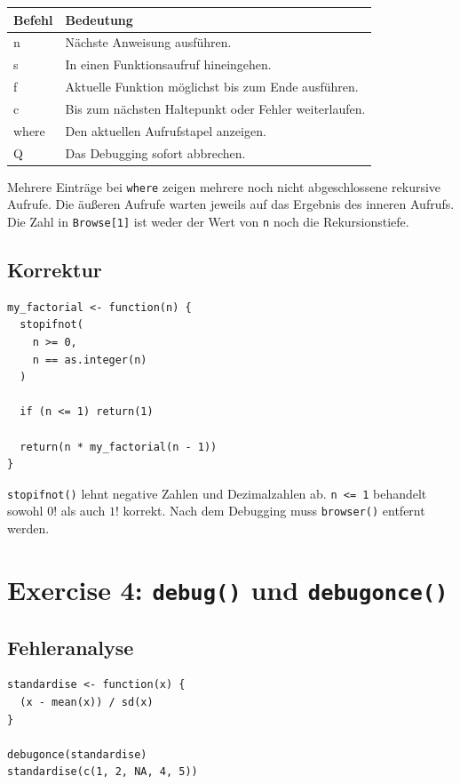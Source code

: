\documentclass[11pt,a4paper]{ctexart}
\begin{document}
\begin{longtable}{>{\ttfamily}p{}p{}}
\toprule
\normalfont Befehl & Bedeutung \\
\midrule
\endhead
n & Nächste Anweisung ausführen.\\
s & In einen Funktionsaufruf hineingehen.\\
f & Aktuelle Funktion möglichst bis zum Ende ausführen.\\
c & Bis zum nächsten Haltepunkt oder Fehler weiterlaufen.\\
where & Den aktuellen Aufrufstapel anzeigen.\\
Q & Das Debugging sofort abbrechen.\\
\bottomrule
\end{longtable}

Mehrere Einträge bei \lstinline|where| zeigen mehrere noch nicht abgeschlossene
rekursive Aufrufe. Die äußeren Aufrufe warten jeweils auf das Ergebnis des
inneren Aufrufs. Die Zahl in \texttt{Browse[1]} ist weder der Wert von
\lstinline|n| noch die Rekursionstiefe.

\subsection{Korrektur}

\begin{lstlisting}[style=rcode]
my_factorial <- function(n) {
  stopifnot(
    n >= 0,
    n == as.integer(n)
  )

  if (n <= 1) return(1)

  return(n * my_factorial(n - 1))
}
\end{lstlisting}

\lstinline|stopifnot()| lehnt negative Zahlen und Dezimalzahlen ab.
\lstinline|n <= 1| behandelt sowohl \(0!\) als auch \(1!\) korrekt. Nach dem
Debugging muss \lstinline|browser()| entfernt werden.

\section{Exercise 4: \texttt{debug()} und \texttt{debugonce()}}

\subsection{Fehleranalyse}

\begin{lstlisting}[style=rcode]
standardise <- function(x) {
  (x - mean(x)) / sd(x)
}

debugonce(standardise)
standardise(c(1, 2, NA, 4, 5))
\end{lstlisting}
\end{document}
